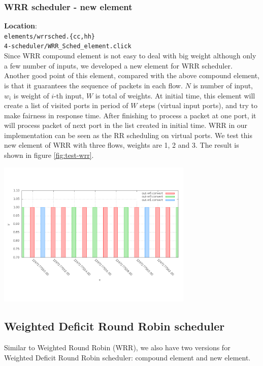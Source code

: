 \documentclass[a4paper]{article}
\begin{document}
  \subsubsection{WRR scheduler - new element}
  \textbf{Location}: \\
  \texttt{elements/wrrsched.\{cc,hh\}} \\ 
  \texttt{4-scheduler/WRR\_Sched\_element.click}\\
  Since WRR compound element is not easy to deal with big weight although only a few number of inputs, we developed a new element for WRR scheduler. Another good point of this element, compared with the above compound element, is that it guarantees the sequence of packets in each flow. $N$ is number of input, $w_i$ is weight of $i$-th input, $W$ is total of weights. At initial time, this element will create a list of visited ports in period of $W$ steps (virtual input ports), and try to make fairness in response time. After finishing to process a packet at one port, it will process packet of next port in the list created in initial time. WRR in our implementation can be seen as the RR scheduling on virtual ports. We test this new element of WRR with three flows, weights are 1, 2 and 3. The result is shown in figure \ref{fig:test-wrr}.
  \begin{center}
	\includegraphics[width=0.70\textwidth]{wrr-dense.png}
	\label{fig:test-wrr}
  \end{center}

  \subsection{Weighted Deficit Round Robin scheduler}
  Similar to Weighted Round Robin (WRR), we also have two versions for Weighted Deficit Round Robin scheduler: compound element and new element.
\end{document}
